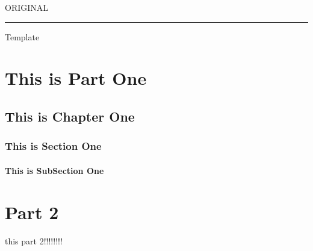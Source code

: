 \documentclass[twoside, letterpaper]{book}
\begin{document}
\pagestyle{fancy}
  \begin{flushright}
  \hfont\Large ORIGINAL\par
  \hrule \vspace{2pt}
  \hfont\huge Template \par
\end{flushright}


\tableofcontents
%
\part{This is Part One}
\chapter{This is Chapter One}
\section{This is Section One}
\lipsum
\subsection{This is SubSection One}
\lipsum
\part{Part 2}
this part 2!!!!!!!!
\end{document}
